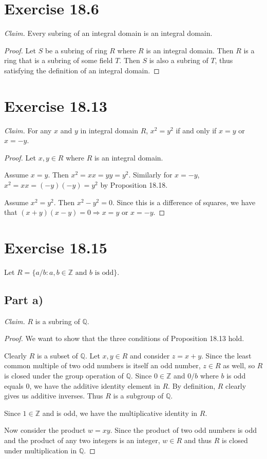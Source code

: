 \documentclass{abrice}
\newcommand{\Z}{\mathbb{Z}}
\newcommand{\Q}{\mathbb{Q}}
\begin{document}
\section{Exercise 18.6}

\emph{Claim.} Every subring of an integral domain is an integral domain.

\begin{proof}
  Let $S$ be a subring of ring $R$ where $R$ is an integral domain. Then $R$ is
  a ring that is a subring of some field $T$. Then $S$ is also a subring of $T$,
  thus satisfying the definition of an integral domain.
\end{proof}

\section{Exercise 18.13}

\emph{Claim.} For any $x$ and $y$ in integral domain $R$, $x^2 = y^2$ if and
only if $x = y$ or $x = -y$.

\begin{proof}
  Let $x,y \in R$ where $R$ is an integral domain.

  Assume $x = y$. Then $x^2 = xx = yy = y^2$. Similarly for $x = -y$, $x^2 = xx
  = (-y)(-y) = y^2$ by Proposition 18.18.

  Assume $x^2 = y^2$. Then $x^2 - y^2 = 0$. Since this is a difference of
  squares, we have that $(x + y)(x - y) = 0 \Rightarrow x = y$ or $x = -y$.
\end{proof}

\section{Exercise 18.15}

Let $R = \{a/b : a,b \in \Z \text{ and } b \text{ is odd}\}$.

\subsection{Part a)}

\emph{Claim.} $R$ is a subring of $\Q$.

\begin{proof}
  We want to show that the three conditions of Proposition 18.13 hold.

  Clearly $R$ is a subset of $\Q$. Let $x,y \in R$ and consider $z = x + y$.
  Since the least common multiple of two odd numbers is itself an odd number, $z
  \in R$ as well, so $R$ is closed under the group operation of $\Q$. Since $0
  \in \Z$ and $0/b$ where $b$ is odd equals $0$, we have the additive identity
  element in $R$. By definition, $R$ clearly gives us additive inverses. Thus
  $R$ is a subgroup of $\Q$.

  Since $1 \in \Z$ and is odd, we have the multiplicative identity in $R$.

  Now consider the product $w = xy$. Since the product of two odd numbers is odd
  and the product of any two integers is an integer, $w \in R$ and thus $R$ is
  closed under multiplication in $\Q$.
\end{proof}
\end{document}
